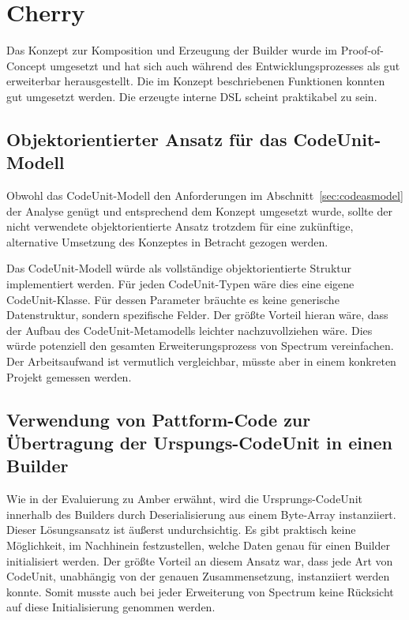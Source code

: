 \documentclass[12pt,oneside,a4paper,parskip]{scrbook}
\begin{document}
\section{Cherry}

Das Konzept zur Komposition und Erzeugung der Builder wurde im Proof-of-Concept umgesetzt und hat sich auch während des Entwicklungsprozesses als gut erweiterbar herausgestellt. Die im Konzept beschriebenen Funktionen konnten gut umgesetzt werden. Die erzeugte interne DSL scheint praktikabel zu sein.

\subsection{Objektorientierter Ansatz für das CodeUnit-Modell}

Obwohl das CodeUnit-Modell den Anforderungen im Abschnitt~\ref{sec:codeasmodel} der Analyse genügt und entsprechend dem Konzept umgesetzt wurde, sollte der nicht verwendete objektorientierte Ansatz trotzdem für eine zukünftige, alternative Umsetzung des Konzeptes in Betracht gezogen werden.

Das CodeUnit-Modell würde als vollständige objektorientierte Struktur implementiert werden. Für jeden CodeUnit-Typen wäre dies eine eigene CodeUnit-Klasse. Für dessen Parameter bräuchte es keine generische Datenstruktur, sondern spezifische Felder. Der größte Vorteil hieran wäre, dass der Aufbau des CodeUnit-Metamodells leichter nachzuvollziehen wäre. Dies würde potenziell den gesamten Erweiterungsprozess von Spectrum vereinfachen. Der Arbeitsaufwand ist vermutlich vergleichbar, müsste aber in einem konkreten Projekt gemessen werden.

\subsection{Verwendung von Pattform-Code zur Übertragung der Urspungs-CodeUnit in einen Builder}

Wie in der Evaluierung zu Amber erwähnt, wird die Ursprungs-CodeUnit innerhalb des Builders durch Deserialisierung aus einem Byte-Array instanziiert. Dieser Lösungsansatz ist äußerst undurchsichtig. Es gibt praktisch keine Möglichkeit, im Nachhinein festzustellen, welche Daten genau für einen Builder initialisiert werden. Der größte Vorteil an diesem Ansatz war, dass jede Art von CodeUnit, unabhängig von der genauen Zusammensetzung, instanziiert werden konnte. Somit musste auch bei jeder Erweiterung von Spectrum keine Rücksicht auf diese Initialisierung genommen werden.
\end{document}
